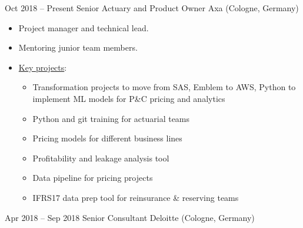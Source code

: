 \documentclass[a4paper,]{fortysecondscv}
\begin{document}
\begin{cvtable}%

    \vspace{\topsep}
    \cvitem
    {Oct 2018 -- Present}
    {Senior Actuary and Product Owner}
    {Axa (Cologne, Germany)}
    {
        \vspace{-\topsep}
        \begin{itemize}[nosep, leftmargin=0pt] %
            \item Project manager and technical lead.
            \item Mentoring junior team members.
            \item \underline{Key projects}:
                  \begin{itemize}
                      \item Transformation projects to move from SAS, Emblem to AWS, Python to implement ML models for P\&C pricing and analytics
                      \item Python and git training for actuarial teams
                      \item Pricing models for different business lines
                      \item Profitability and leakage analysis tool
                      \item Data pipeline for pricing projects
                      \item IFRS17 data prep tool for reinsurance \& reserving teams
                  \end{itemize}
        \end{itemize}
    }
    \vspace{\topsep}
    \cvitem
    {Apr 2018 -- Sep 2018}
    {Senior Consultant}
    {Deloitte (Cologne, Germany)}

\end{cvtable}
\end{document}

